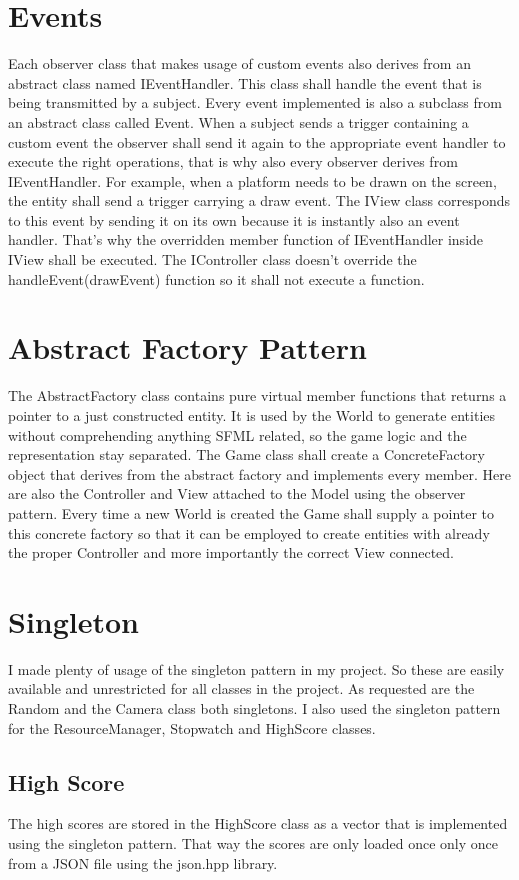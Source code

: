 \documentclass{report}
\begin{document}
\section{Events}
Each observer class that makes usage of custom events also derives from an abstract class named IEventHandler. This class shall handle the event that is being transmitted by a subject. Every event implemented is also a subclass from an abstract class called Event. When a subject sends a trigger containing a custom event the observer shall send it again to the appropriate event handler to execute the right operations, that is why also every observer derives from IEventHandler. For example, when a platform needs to be drawn on the screen, the entity shall send a trigger carrying a draw event. The IView class corresponds to this event by sending it on its own because it is instantly also an event handler. That's why the overridden member function of IEventHandler inside IView shall be executed. The IController class doesn't override the handleEvent(drawEvent) function so it shall not execute a function.

\section{Abstract Factory Pattern}
The AbstractFactory class contains pure virtual member functions that returns a pointer to a just constructed entity. It is used by the World to generate entities without comprehending anything SFML related, so the game logic and the representation stay separated. The Game class shall create a ConcreteFactory object that derives from the abstract factory and implements every member. Here are also the Controller and View attached to the Model using the observer pattern. Every time a new World is created the Game shall supply a pointer to this concrete factory so that it can be employed to create entities with already the proper Controller and more importantly the correct View connected.

\section{Singleton}
I made plenty of usage of the singleton pattern in my project. So these are easily available and unrestricted for all classes in the project. As requested are the Random and the Camera class both singletons. I also used the singleton pattern for the ResourceManager, Stopwatch and HighScore classes.

\subsection{High Score}
The high scores are stored in the HighScore class as a vector that is implemented using the singleton pattern. That way the scores are only loaded once only once from a JSON file using the json.hpp library.
\end{document}
